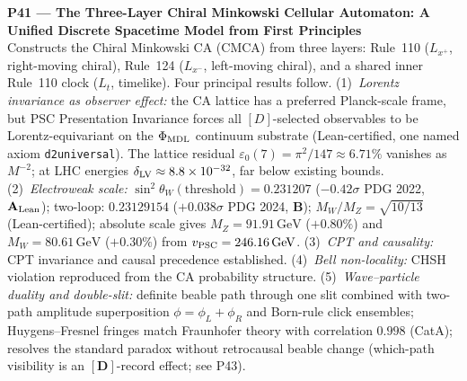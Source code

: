 \documentclass[11pt]{article}
\newcommand{\lean}[1]{%
  \penalty-100
  \begingroup\def\_{{\textunderscore\allowbreak}}\texttt{#1}\endgroup}
\newcommand{\CatAL}{\ensuremath{\textbf{A}_{\rm Lean}}}
\newcommand{\CatB}{\textbf{B}}
\begin{document}
\medskip
\noindent\textbf{P41 — The Three-Layer Chiral Minkowski Cellular Automaton: A Unified
Discrete Spacetime Model from First Principles}~\cite{SpivackCMCA}\\
Constructs the Chiral Minkowski CA (CMCA) from three layers: Rule~110 ($L_{x^+}$,
right-moving chiral), Rule~124 ($L_{x^-}$, left-moving chiral), and a shared inner
Rule~110 clock ($L_t$, timelike).  Four principal results follow.
(1)~\textit{Lorentz invariance as observer effect:} the CA lattice has a preferred
Planck-scale frame, but PSC Presentation Invariance forces all $[D]$-selected
observables to be Lorentz-equivariant on the $\Phi_{\rm MDL}$ continuum substrate
(Lean-certified, one named axiom \lean{d2\_universal}).  The lattice residual
$\varepsilon_0(7) = \pi^2/147 \approx 6.71\%$ vanishes as $M^{-2}$; at LHC energies
$\delta_{\rm LV} \approx 8.8\times10^{-32}$, far below existing bounds.
(2)~\textit{Electroweak scale:} $\sin^2\theta_W(\text{threshold})=0.231207$ ($-0.42\sigma$ PDG 2022, \CatAL); two-loop: $0.23129154$ ($+0.038\sigma$ PDG 2024, \CatB); $M_W/M_Z =
\sqrt{10/13}$ (Lean-certified); absolute scale gives $M_Z=91.91\,\mathrm{GeV}$
($+0.80\%$) and $M_W=80.61\,\mathrm{GeV}$ ($+0.30\%$) from $v_{\rm PSC}=246.16\,\mathrm{GeV}$.
(3)~\textit{CPT and causality:} CPT invariance and causal precedence established.
(4)~\textit{Bell non-locality:} CHSH violation reproduced from the CA probability structure.
(5)~\textit{Wave--particle duality and double-slit:} definite beable path through one slit
combined with two-path amplitude superposition $\phi=\phi_L+\phi_R$ and Born-rule click
ensembles; Huygens--Fresnel fringes match Fraunhofer theory with correlation $0.998$
(CatA); resolves the standard paradox without retrocausal beable change (which-path
visibility is an $[\mathbf{D}]$-record effect; see P43).
\end{document}
